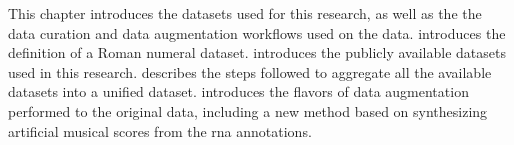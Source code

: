 
This chapter introduces the datasets used for this research,
as well as the the data curation and data augmentation
workflows used on the data.
 introduces the definition
of a Roman numeral dataset. 
introduces the publicly available datasets used in this
research.  describes
the steps followed to aggregate all the available datasets
into a unified dataset.  introduces
the flavors of data augmentation performed to the original
data, including a new method based on synthesizing
artificial musical scores from the \gls{rna} annotations.
